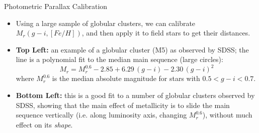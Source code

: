 \documentclass[letterpaper,landscape]{slides}
\begin{document}
\begin{slide}
{\begin{minipage}[t]{8cm}
\begin{center}
\end{center}
\end{minipage}

\begin{minipage}[t]{16cm}
\begin{center}
\vskip -1in
{\large \color{red} Photometric Parallax Calibration}
\end{center}


\begin{itemize}
\item {\color{blue} Using a large sample of globular clusters, we can calibrate 
      $M_r(g-i,[Fe/H])$, and then apply it to field stars to get their distances.}
\item {\bf Top Left:} an example of a globular cluster (M5) as observed by
       SDSS; the line is a polynomial fit to the median main sequence (large 
       circles):
\begin{equation}
       M_r = M_r^{0.6} -2.85 + 6.29 \, (g-i) -2.30 \, (g-i)^2  \nonumber
\end{equation}
where $M_r^{0.6}$ is the median absolute magnitude for stars 
with $0.5<g-i<0.7$. 
\item {\bf Bottom Left:} this is a good fit to a number of globular 
  clusters observed by SDSS, showing that the main effect of metallicity
  is to slide the main sequence vertically (i.e. along luminosity axis,
  changing $M_r^{0.6}$), without much effect on its {\it shape}.
\end{itemize}

\end{minipage}}
\vfill 
\end{slide}
\end{document}
